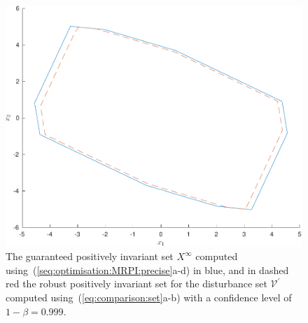 \documentclass{ifacconf}
\providecommand{\V}{\mathcal V}
\begin{document}
\begin{figure}[ht]
\includegraphics[width=.99\linewidth]{MRPIsetOptimised.pdf}
\caption{The guaranteed positively invariant set $X^\infty$ computed using~\mbox{(\ref{seq:optimisation:MRPI:precise}a-d)} in \textcolor[rgb]{0,0.5216,0.7373}{blue}, and in \textcolor[rgb]{1,0,0}{dashed red} the robust positively invariant set for the disturbance set $\V^\prime$ computed using~(\ref{eq:comparison:set}a-b) with a confidence level of $1-\beta = 0.999$.}
\label{fig:MRPI:optimised}
\vspace{2mm}\end{figure}
\end{document}
